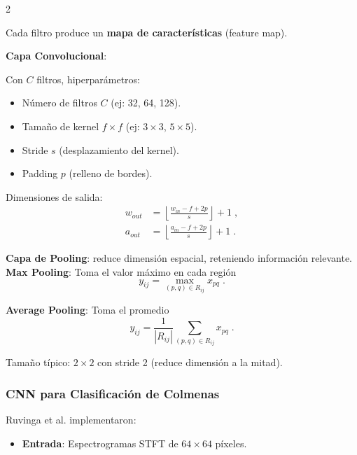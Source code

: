 \documentclass[12pt]{report}
\newenvironment{tightmulticols}{%
  \begin{multicols}{2}
  \setlength{\parskip}{1.2pt}
  \linespread{1}\selectfont
}{%
  \end{multicols}
}
\begin{document}
\begin{tightmulticols}
\noindent Cada filtro produce un \textbf{mapa de características} (feature map).

\noindent\textbf{Capa Convolucional}:

\noindent Con $C$ filtros, hiperparámetros:
\begin{itemize}
    \item Número de filtros $C$ (ej: 32, 64, 128).
    \item Tamaño de kernel $f \times f$ (ej: $3 \times 3$, $5 \times 5$).
    \item Stride $s$ (desplazamiento del kernel).
    \item Padding $p$ (relleno de bordes).
\end{itemize}

\par Dimensiones de salida:
\begin{align*}
    w_{out} &= \left\lfloor \frac{w_{in} - f + 2p}{s} \right\rfloor + 1 \; , \\
    a_{out} &= \left\lfloor \frac{a_{in} - f + 2p}{s} \right\rfloor + 1 \; .
\end{align*}

\noindent\textbf{Capa de Pooling}: reduce dimensión espacial, reteniendo información relevante.\\

\noindent\textbf{Max Pooling}: Toma el valor máximo en cada región
\begin{equation*}
    y_{ij} = \max_{(p,q) \in R_{ij}} x_{pq} \; .
\end{equation*}

\noindent\textbf{Average Pooling}: Toma el promedio
\begin{equation*}
    y_{ij} = \frac{1}{|R_{ij}|} \sum_{(p,q) \in R_{ij}} x_{pq} \; .
\end{equation*}

\noindent Tamaño típico: $2 \times 2$ con stride 2 (reduce dimensión a la mitad).

\subsubsection{CNN para Clasificación de Colmenas}

\noindent Ruvinga et al. \cite{ruvinga2023} implementaron:

\begin{itemize}
    \item \textbf{Entrada}: Espectrogramas STFT de $64 \times 64$ píxeles.
    

\end{itemize}
\end{tightmulticols}
\end{document}
